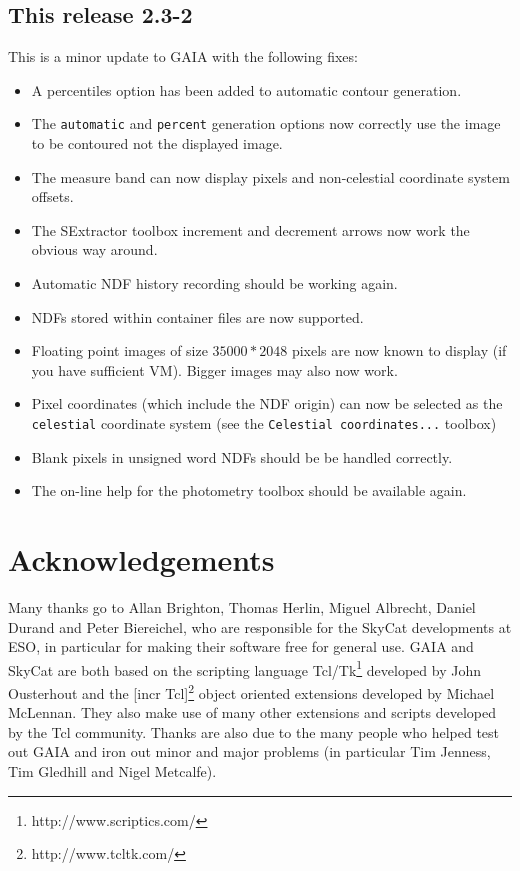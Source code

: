 \documentclass[twoside,11pt]{article}
\newcommand{\htmladdnormallinkfoot}[2]{#1\footnote{#2}}
\newcommand{\htmladdnormallink}[2]{#1}
\newcommand{\xlabel}[1]{}
\renewcommand{\_}{\texttt{\symbol{95}}}
\newcommand{\mytt}[1]{{\tt{#1}}}
\begin{document}
\subsection{This release 2.3-2}
This is a minor update to GAIA with the following fixes:
\begin{itemize}
  \item A percentiles option has been added to automatic contour
      generation.

  \item The \mytt{automatic} and \mytt{percent} generation options now
        correctly use the image to be contoured not the displayed image.

  \item The measure band can now display pixels and non-celestial
        coordinate system offsets.

  \item The SExtractor toolbox increment and decrement arrows now work 
        the obvious way around.

  \item Automatic NDF history recording should be working again.

  \item NDFs stored within container files are now supported.

  \item Floating point images of size $35000*2048$ pixels are now 
        known to display (if you have sufficient VM). Bigger images
        may also now work.

  \item Pixel coordinates (which include the NDF origin) can now be
        selected as the \mytt{celestial} coordinate system (see the
        \mytt{Celestial coordinates...} toolbox)

  \item Blank pixels in unsigned word NDFs should be be handled 
        correctly.

  \item The on-line help for the photometry toolbox should be
        available again. 
\end{itemize}


\section{\xlabel{acknowledgements}Acknowledgements}

Many thanks go to Allan Brighton, Thomas Herlin, Miguel Albrecht,
Daniel Durand and Peter Biereichel, who are responsible for the
\htmladdnormallink{SkyCat}{http://archive.eso.org/skycat/}
developments at ESO, in particular for making their software free for
general use. GAIA and SkyCat are both based on the scripting language
\htmladdnormallinkfoot{Tcl/Tk}{http://www.scriptics.com/} developed by
John Ousterhout and the \htmladdnormallinkfoot{[incr Tcl]}
{http://www.tcltk.com/} object oriented extensions developed by
Michael McLennan.  They also make use of many other extensions
and scripts developed by the Tcl community. Thanks are also due to the
many people who helped test out GAIA and iron out minor and major
problems (in particular Tim Jenness, Tim Gledhill and Nigel Metcalfe).

\end{document}
